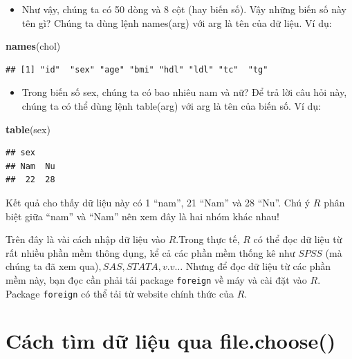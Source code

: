 \documentclass[
]{book}
\newenvironment{Shaded}{\begin{snugshade}}{\end{snugshade}}
\newcommand{\KeywordTok}[1]{\textcolor[rgb]{0.13,0.29,0.53}{\textbf{#1}}}
\newcommand{\NormalTok}[1]{#1}
\providecommand{\tightlist}{%
  \setlength{\itemsep}{0pt}\setlength{\parskip}{0pt}}
\begin{document}
\begin{itemize}
\tightlist
\item
  Như vậy, chúng ta có 50 dòng và 8 cột (hay biến số). Vậy những biến số này tên gì? Chúng ta dùng lệnh names(arg) với arg là tên của dữ liệu. Ví dụ:
\end{itemize}

\begin{Shaded}
\begin{Highlighting}[]
\KeywordTok{names}\NormalTok{(chol)}
\end{Highlighting}
\end{Shaded}

\begin{verbatim}
## [1] "id"  "sex" "age" "bmi" "hdl" "ldl" "tc"  "tg"
\end{verbatim}

\begin{itemize}
\tightlist
\item
  Trong biến số sex, chúng ta có bao nhiêu nam và nữ? Để trả lời câu hỏi này, chúng ta có thể dùng lệnh table(arg) với arg là tên của biến số. Ví dụ:
\end{itemize}

\begin{Shaded}
\begin{Highlighting}[]
\KeywordTok{table}\NormalTok{(sex)}
\end{Highlighting}
\end{Shaded}

\begin{verbatim}
## sex
## Nam  Nu 
##  22  28
\end{verbatim}

Kết quả cho thấy dữ liệu này có 1 ``nam'', 21 ``Nam'' và 28 ``Nu''. Chú ý \(R\) phân biệt giữa ``nam'' và ``Nam'' nên xem đây là hai nhóm khác nhau!

Trên đây là vài cách nhập dữ liệu vào \(R\).Trong thực tế, \(R\) có thể đọc dữ liệu từ rất nhiều phần mềm thông dụng, kể cả các phần mềm thống kê như \(SPSS\) (mà chúng ta đã xem qua)\(, SAS, STATA, v.v…\) Nhưng để đọc dữ liệu từ các phần mềm này, bạn đọc cần phải tải package \texttt{foreign} về máy và cài đặt vào \(R\). Package \texttt{foreign} có thể tải từ website chính thức của \(R\).

\hypertarget{cuxe1ch-tuxecm-dux1eef-liux1ec7u-qua-file.choose}{%
\section{Cách tìm dữ liệu qua file.choose()}\label{cuxe1ch-tuxecm-dux1eef-liux1ec7u-qua-file.choose}}
\end{document}
